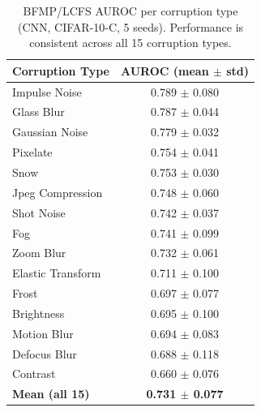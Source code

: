 \begin{table}[t]
\centering
\caption{BFMP/LCFS AUROC per corruption type (CNN, CIFAR-10-C, 5 seeds). Performance is consistent across all 15 corruption types.}
\label{tab:per_corruption_full}
\begin{tabular}{lc}
\toprule
Corruption Type & AUROC (mean $\pm$ std) \\
\midrule
Impulse Noise & 0.789 $\pm$ 0.080 \\
Glass Blur & 0.787 $\pm$ 0.044 \\
Gaussian Noise & 0.779 $\pm$ 0.032 \\
Pixelate & 0.754 $\pm$ 0.041 \\
Snow & 0.753 $\pm$ 0.030 \\
Jpeg Compression & 0.748 $\pm$ 0.060 \\
Shot Noise & 0.742 $\pm$ 0.037 \\
Fog & 0.741 $\pm$ 0.099 \\
Zoom Blur & 0.732 $\pm$ 0.061 \\
Elastic Transform & 0.711 $\pm$ 0.100 \\
Frost & 0.697 $\pm$ 0.077 \\
Brightness & 0.695 $\pm$ 0.100 \\
Motion Blur & 0.694 $\pm$ 0.083 \\
Defocus Blur & 0.688 $\pm$ 0.118 \\
Contrast & 0.660 $\pm$ 0.076 \\
\midrule
\textbf{Mean (all 15)} & \textbf{0.731 $\pm$ 0.077} \\
\bottomrule
\end{tabular}
\end{table}